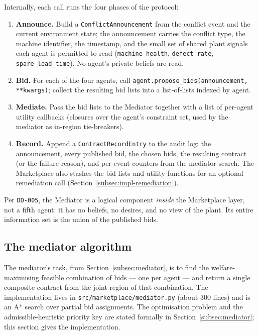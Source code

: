 Internally, each call runs the four phases of the protocol:

\begin{enumerate}[leftmargin=1.8em,itemsep=0.15em]
  \item \textbf{Announce.} Build a \texttt{ConflictAnnouncement} from
    the conflict event and the current environment state; the
    announcement carries the conflict type, the machine identifier, the
    timestamp, and the small set of shared plant signals each agent is
    permitted to read (\texttt{machine\_health}, \texttt{defect\_rate},
    \texttt{spare\_lead\_time}). No agent's private beliefs are read.
  \item \textbf{Bid.} For each of the four agents, call
    \texttt{agent.propose\_bids(announcement, **kwargs)}; collect the
    resulting bid lists into a list-of-lists indexed by agent.
  \item \textbf{Mediate.} Pass the bid lists to the Mediator together
    with a list of per-agent utility callbacks (closures over the
    agent's constraint set, used by the mediator as in-region
    tie-breakers).
  \item \textbf{Record.} Append a \texttt{ContractRecordEntry} to the
    audit log: the announcement, every published bid, the chosen bids,
    the resulting contract (or the failure reason), and per-event
    counters from the mediator search. The Marketplace also stashes the
    bid lists and utility functions for an optional remediation call
    (Section~\ref{subsec:impl-remediation}).
\end{enumerate}

Per \texttt{DD-005}, the Mediator is a logical component
\emph{inside} the Marketplace layer, not a fifth agent: it has no
beliefs, no desires, and no view of the plant. Its entire information
set is the union of the published bids.

\subsection{The mediator algorithm}
\label{subsec:impl-mediator}

The mediator's task, from Section~\ref{subsec:mediator}, is to find the
welfare-maximising feasible combination of bids --- one per agent ---
and return a single composite contract from the joint region of that
combination. The implementation lives in
\texttt{src/marketplace/mediator.py} (about 300 lines) and is an A*
search over partial bid assignments. The optimisation problem and the
admissible-heuristic priority key are stated formally in
Section~\ref{subsec:mediator}; this section gives the implementation.


